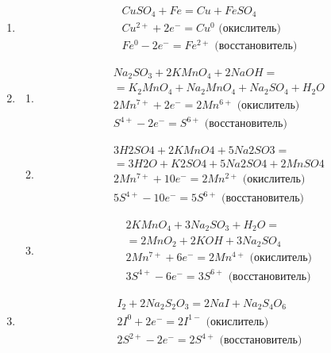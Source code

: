 \documentclass[a4paper]{article}
\begin{document}
\begin{enumerate}
    \item %
    \begin{gather*}
        CuSO_4 + Fe = Cu + FeSO_4 \\
        Cu^{2+} + 2e^- = Cu^0 \text{ (окислитель)} \\
        Fe^0 - 2e^- = Fe^{2+} \text{ (восстановитель)}
    \end{gather*}
    \item
    \begin{enumerate}
        \item
        \begin{gather*}
            Na_2SO_3 + 2KMnO_4 + 2NaOH = \\
            = K_2MnO_4 + Na_2MnO_4 + Na_2SO_4 + H_2O \\
            2Mn^{7+} + 2e^- = 2Mn^{6+} \text{ (окислитель)} \\
            S^{4+} - 2e^- = S^{6+} \text{ (восстановитель)}
        \end{gather*}
        \item \begin{gather*}
            3H2SO4 + 2KMnO4 + 5Na2SO3 = \\
            = 3H2O + K2SO4 + 5Na2SO4 + 2MnSO4 \\
            2Mn^{7+} + 10e^- = 2Mn^{2+} \text{ (окислитель)} \\
            5S^{4+} - 10e^- = 5S^{6+} \text{ (восстановитель)}
        \end{gather*} 
        \item \begin{gather*}
            2KMnO_4 + 3Na_2SO_3 + H_2O = \\
            = 2MnO_2 + 2KOH + 3Na_2SO_4 \\
            2Mn^{7+} + 6e^- = 2Mn^{4+} \text{ (окислитель)} \\
            3S^{4+} - 6e^- = 3S^{6+} \text{ (восстановитель)}
        \end{gather*}
    \end{enumerate}
    \item %
    \begin{gather*}
        I_2 + 2Na_2S_2O_3 = 2NaI + Na_2S_4O_6 \\
        2I^0 + 2e^- = 2I^{1-} \text{ (окислитель)} \\
        2S^{2+} - 2e^- = 2S^{4+} \text{ (восстановитель)}
    \end{gather*}
\end{enumerate}
\end{document}

